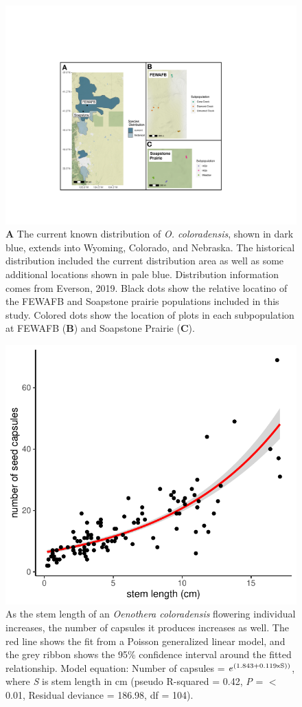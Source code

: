 \documentclass[12pt, letterpaper]{article}
\begin{document}
\begin{figure}[h]
    \centering
    \includegraphics[width = 1\textwidth]{figures/COBP_mapFigure.pdf}
    \caption{\textbf{A} The current known distribution of \textit{O. coloradensis}, shown in dark blue, extends into Wyoming, Colorado, and Nebraska. The historical distribution included the current distribution area as well as some additional locations shown in pale blue. Distribution information comes from Everson, 2019. Black dots show the relative locatino of the FEWAFB and Soapstone prairie populations included in this study. Colored dots show the location of plots in each subpopulation at FEWAFB (\textbf{B}) and Soapstone Prairie (\textbf{C}).}
    \label{fig:plotMap}
\end{figure}

\begin{figure}[h]
  \centering
  \includegraphics[width=.7\textwidth]{seedRegressionPlot.pdf}
  \caption{As the stem length of an \textit{Oenothera coloradensis} flowering individual increases, the number of capsules it produces increases as well. The red line shows the fit from a Poisson generalized linear model, and the grey ribbon shows the 95\% confidence interval around the fitted relationship. Model equation: Number of capsules = $e^{(1.843 + 0.119\text{\textsf{x}}\text{S}))}$, where \textit{S} is stem length in cm (pseudo R-squared = 0.42, \textit{P} = $<$ 0.01, Residual deviance = 186.98, df = 104).  }
  \label{fig:seedRegression}
\end{figure} 
\end{document}
